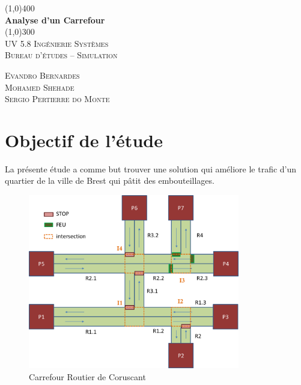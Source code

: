 \documentclass[12pt]{article} %
\begin{document}
\begin{titlepage}
	\begin{center}
	\line(1,0){400} \\
	[0.25in]
	\huge{\bfseries Analyse d'un Carrefour} \\
	[2mm]
	\line(1,0){300} \\
	[1.5cm]
	\textsc{\LARGE UV 5.8 Ingénierie Systèmes} \\
	[0.75cm]
	\textsc{\Large Bureau d'études – Simulation} \\
	[10cm]
	\end{center}
	\begin{flushright}
	\textsc{\large Evandro Bernardes \\ Mohamed Shehade \\ Sergio Pertierre do Monte  \\}
	\end{flushright}

\end{titlepage}

\tableofcontents
\thispagestyle{empty}
\cleardoublepage


\listoffigures
\cleardoublepage

\setcounter{page}{1}

\section{Objectif de l'étude}\label{sec:1}
La présente étude a comme but trouver une solution qui améliore le trafic d'un quartier de la ville de Brest qui pâtit des embouteillages.

\begin{figure}[H]
	\centering
	\includegraphics[height=3in]{Figure1.png}
	\caption[Figure 1]{Carrefour Routier de Coruscant}
	\label{fig:fig1}
\end{figure}
\end{document}
